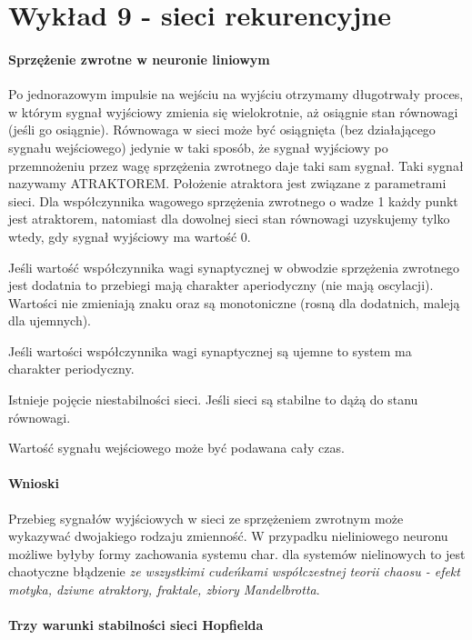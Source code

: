 \section{Wykład 9 - sieci rekurencyjne}

\paragraph{Sprzężenie zwrotne w neuronie liniowym}

Po jednorazowym impulsie na wejściu na wyjściu otrzymamy długotrwały proces, w którym sygnał wyjściowy zmienia
się wielokrotnie, aż osiągnie stan równowagi (jeśli go osiągnie).
Równowaga w sieci może być osiągnięta (bez
działającego sygnału wejściowego) jedynie w taki
sposób, że sygnał wyjściowy po przemnożeniu przez
wagę sprzężenia zwrotnego daje taki sam sygnał. Taki
sygnał nazywamy ATRAKTOREM. Położenie
atraktora jest związane z parametrami sieci. Dla
współczynnika wagowego sprzężenia zwrotnego o
wadze 1 każdy punkt jest atraktorem, natomiast dla
dowolnej sieci stan równowagi uzyskujemy tylko
wtedy, gdy sygnał wyjściowy ma wartość 0.

Jeśli wartość współczynnika wagi synaptycznej w obwodzie sprzężenia zwrotnego jest dodatnia
to przebiegi mają charakter aperiodyczny (nie mają oscylacji). Wartości nie zmieniają znaku oraz 
są monotoniczne (rosną dla dodatnich, maleją dla ujemnych).

Jeśli wartości współczynnika wagi synaptycznej są ujemne to system ma charakter periodyczny.

Istnieje pojęcie niestabilności sieci. Jeśli sieci są stabilne to dążą do stanu równowagi.

Wartość sygnału wejściowego może być podawana cały czas.

\paragraph{Wnioski}

Przebieg sygnałów wyjściowych w sieci ze sprzężeniem zwrotnym może wykazywać dwojakiego rodzaju
zmienność. W przypadku nieliniowego neuronu możliwe byłyby formy zachowania systemu char. dla
systemów nielinowych to jest chaotyczne błądzenie \textit{ze wszystkimi cudeńkami współczestnej
teorii chaosu - efekt motyka, dziwne atraktory, fraktale, zbiory Mandelbrotta}.

\paragraph{Trzy warunki stabilności sieci Hopfielda}

